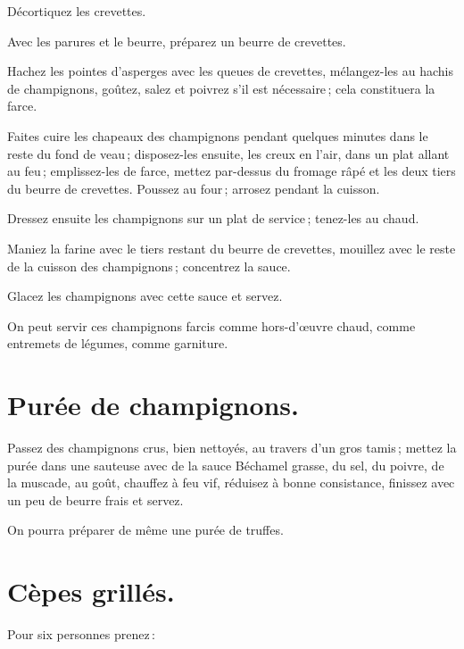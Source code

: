 Décortiquez les crevettes.

Avec les parures et le beurre, préparez un beurre de crevettes.

Hachez les pointes d'asperges avec les queues de crevettes, mélangez-les au
hachis de champignons, goûtez, salez et poivrez s'il est nécessaire ; cela
constituera la farce.

Faites cuire les chapeaux des champignons pendant quelques minutes dans le
reste du fond de veau ; disposez-les ensuite, les creux en l'air, dans un plat
allant au feu ; emplissez-les de farce, mettez par-dessus du fromage râpé et
les deux tiers du beurre de crevettes. Poussez au four ; arrosez pendant la
cuisson.

Dressez ensuite les champignons sur un plat de service ; tenez-les au chaud.

Maniez la farine avec le tiers restant du beurre de crevettes, mouillez avec le
reste de la cuisson des champignons ; concentrez la sauce.

Glacez les champignons avec cette sauce et servez.

\medskip

On peut servir ces champignons farcis comme hors-d'œuvre chaud, comme entremets
de légumes, comme garniture.

\section*{\centering Purée de champignons.}
{}

Passez des champignons crus, bien nettoyés, au travers d'un gros tamis ; mettez
la purée dans une sauteuse avec de la sauce Béchamel grasse, du sel, du poivre,
de la muscade, au goût, chauffez à feu vif, réduisez à bonne consistance,
finissez avec un peu de beurre frais et servez.

\sk

On pourra préparer de même une purée de truffes.

\section*{\centering Cèpes grillés.}
{}
\label{pg0805} \hypertarget{p0805}{}

Pour six personnes prenez :

